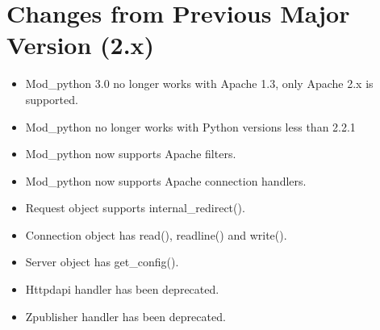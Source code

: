\chapter{Changes from Previous Major Version (2.x)\label{app-changes}}


\begin{itemize}

\item
Mod_python 3.0 no longer works with Apache 1.3, only Apache 2.x is
supported.
\item
Mod_python no longer works with Python versions less than 2.2.1
\item 
Mod_python now supports Apache filters.
\item 
Mod_python now supports Apache connection handlers.
\item 
Request object supports internal_redirect().
\item
Connection object has read(), readline() and write().
\item
Server object has get_config().
\item
{} 
Httpdapi handler has been deprecated.
\item
{}
Zpublisher handler has been deprecated.


\end{itemize}
